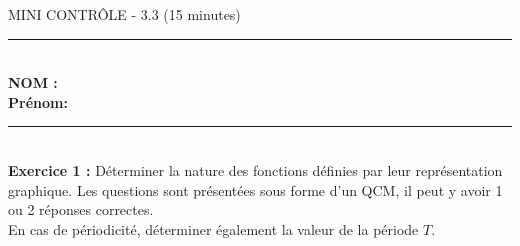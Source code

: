 \documentclass[11pt,a4paper]{article}
\begin{document}
\center \LARGE{MINI CONTRÔLE - 3.3 (15 minutes)}\
\\[0,3cm]

\normalsize

\hrule\
\\[0,2cm]

\flushleft \textbf{NOM :\\
Prénom:\\[0,2cm]
}
\hrule\
\\[0,2cm]

\textbf{Exercice 1 :} Déterminer la nature des fonctions définies par leur représentation graphique. Les questions sont présentées sous forme d’un QCM, il peut y avoir 1 ou 2 réponses correctes.\\ En cas de périodicité, déterminer également la valeur de la période $T$.\\ [5mm]
\end{document}
